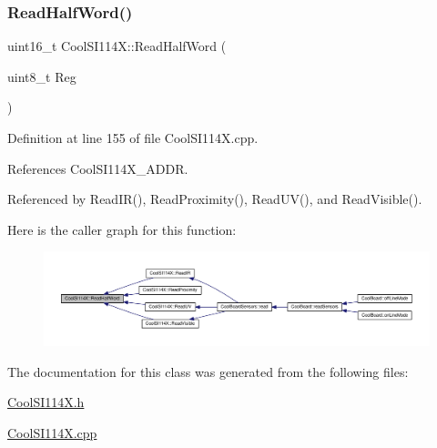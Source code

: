\subsubsection{\texorpdfstring{Read\+Half\+Word()}{ReadHalfWord()}}
{\footnotesize\ttfamily uint16\+\_\+t Cool\+S\+I114\+X\+::\+Read\+Half\+Word (\begin{DoxyParamCaption}\item[{uint8\+\_\+t}]{Reg }\end{DoxyParamCaption})\hspace{0.3cm}{\ttfamily [private]}}



Definition at line 155 of file Cool\+S\+I114\+X.\+cpp.



References Cool\+S\+I114\+X\+\_\+\+A\+D\+DR.



Referenced by Read\+I\+R(), Read\+Proximity(), Read\+U\+V(), and Read\+Visible().

Here is the caller graph for this function\+:\nopagebreak
\begin{figure}[H]
\begin{center}
\leavevmode
\includegraphics[width=350pt]{dd/d67/class_cool_s_i114_x_a1d25c9e137874af529804c2ec796a6b9_icgraph}
\end{center}
\end{figure}


The documentation for this class was generated from the following files\+:\begin{DoxyCompactItemize}
\item 
\hyperlink{_cool_s_i114_x_8h}{Cool\+S\+I114\+X.\+h}\item 
\hyperlink{_cool_s_i114_x_8cpp}{Cool\+S\+I114\+X.\+cpp}\end{DoxyCompactItemize}
